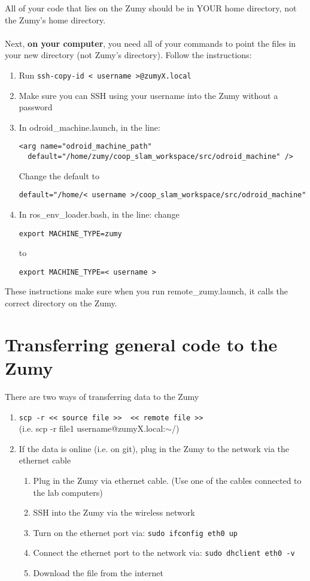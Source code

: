 \documentclass[10pt]{article}
\begin{document}
All of your code that lies on the Zumy should be in YOUR home directory, not the Zumy's home directory.
\\ \\
Next, \textbf{on your computer}, you need all of your commands to point the files in your new directory (not Zumy's directory).
Follow the instructions:
\begin{enumerate}
\item Run \verb=ssh-copy-id < username >@zumyX.local=
\item Make sure you can SSH using your username into the Zumy without a password
\item In odroid\_machine.launch, in the line:
\begin{verbatim}
<arg name="odroid_machine_path" 
  default="/home/zumy/coop_slam_workspace/src/odroid_machine" />
\end{verbatim}
Change the default to 
\begin{verbatim}
default="/home/< username >/coop_slam_workspace/src/odroid_machine"
\end{verbatim}
\item In ros\_env\_loader.bash, in the line: change 
\begin{verbatim}
export MACHINE_TYPE=zumy
\end{verbatim}
 to 
\begin{verbatim}
export MACHINE_TYPE=< username >
\end{verbatim}
\end{enumerate}

These instructions make sure when you run remote\_zumy.launch, it calls the correct directory on the Zumy.

\section{Transferring general code to the Zumy}

There are two ways of transferring data to the Zumy

\begin{enumerate}
\item \verb=scp -r << source file >>  << remote file >>= \\ (i.e.  scp -r file1 username@zumyX.local:$\sim$/)
\item If the data is online (i.e. on git), plug in the Zumy to the network via the ethernet cable
  \begin{enumerate}
      \item Plug in the Zumy via ethernet cable.  (Use one of the cables connected to the lab computers)
      \item SSH into the Zumy via the wireless network
      \item Turn on the ethernet port via: \verb=sudo ifconfig eth0 up=
      \item Connect the ethernet port to the network via: \verb=sudo dhclient eth0 -v= 
      \item Download the file from the internet
  \end{enumerate}
\end{enumerate}
\end{document}
